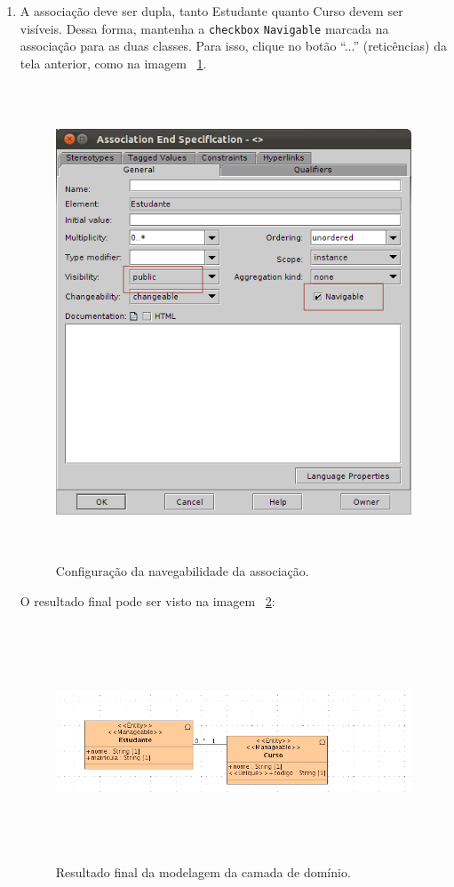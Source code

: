 \begin{enumerate}
\item A associação deve ser dupla, tanto Estudante quanto Curso devem ser
visíveis. Dessa forma, mantenha a \texttt{checkbox} \texttt{Navigable} marcada na associação para
as duas classes. Para isso, clique no botão “...” (reticências) da tela
anterior, como na imagem ~\ref{config_navigable_associacao}.
\begin{figure}[H]
	\centering
	\includegraphics[width=350pt,height=400pt]{imgs/tutorial-mdarte-0006.png}
	\caption{Configuração da navegabilidade da associação.}
	\label{config_navigable_associacao}
\end{figure}
		
O resultado final pode ser visto na imagem ~\ref{resultado_diagrama_classe}: \hfill

\begin{figure}[H]
	\centering
	\includegraphics[width=500pt,height=200pt]{imgs/tutorial-mdarte-0007.png}
	\caption{Resultado final da modelagem da camada de domínio.}
	\label{resultado_diagrama_classe}
\end{figure}
	

\end{enumerate}
